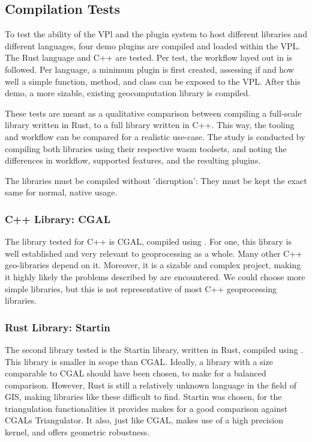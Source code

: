 \subsection{Compilation Tests}
\label{sec:method:tests:compilation}

To test the ability of the VPl and the plugin system to host different libraries and different languages, four demo plugins are compiled and loaded within the VPL.  
The Rust language and C++ are tested. 
Per test, the workflow layed out in  is followed. 
Per language, a minimum plugin is first created, assessing if and how well a simple function, method, and class can be exposed to the VPL.
After this demo, a more sizable, existing geocomputation library is compiled.

These tests are meant as a qualitative comparison between compiling a full-scale library written in Rust, to a full library written in C++. 
This way, the tooling and workflow can be compared for a realistic use-case. 
The study is conducted by compiling both libraries using their respective \ac{wasm} toolsets, and noting the differences in workflow, supported features, and the resulting plugins. 

The libraries must be compiled without 'disruption': They must be kept the exact same for normal, native usage. 


\subsubsection{C++ Library: CGAL} 
The library tested for C++ is CGAL, compiled using . 
For one, this library is well established and very relevant to geoprocessing as a whole. 
Many other C++ geo-libraries depend on it.
Moreover, it is a sizable and complex project, making it highly likely the problems described by  are encountered. 
We could choose more simple libraries, but this is not representative of most C++ geoprocessing libraries. 

\subsubsection{Rust Library: Startin}
The second library tested is the Startin library, written in Rust, compiled using .  
This library is smaller in scope than CGAL. 
Ideally, a library with a size comparable to CGAL should have been chosen, to make for a balanced comparison. 
However, Rust is still a relatively unknown language in the field of GIS, making libraries like these difficult to find. 
Startin was chosen, for the triangulation functionalities it provides makes for a good comparison against CGALs Triangulator. 
It also, just like CGAL, makes use of a high precision kernel, and offers geometric robustness. 


